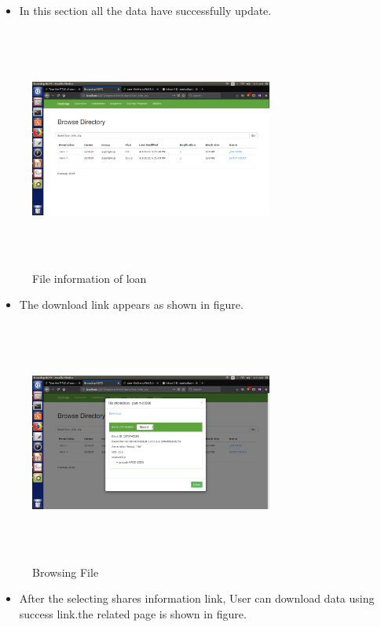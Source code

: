 \begin{itemize}
    \item In this section all the data have successfully update.
\end{itemize}
\begin{figure}[htb]
\centering
\includegraphics[width=8cm,height=8cm]{7pag.png}
    \caption{File information of loan}
\end{figure} \newpage

\begin{itemize}
    \item The download link appears as shown in figure.
\end{itemize}
\begin{figure}[htb]
\centering
\includegraphics[width=8cm,height=8cm]{8page.png}
    \caption{Browsing File}
\end{figure} \newpage
\begin{itemize}
    \item After the selecting shares information link, User can download data using success link.the related page is shown in figure.
\end{itemize}

